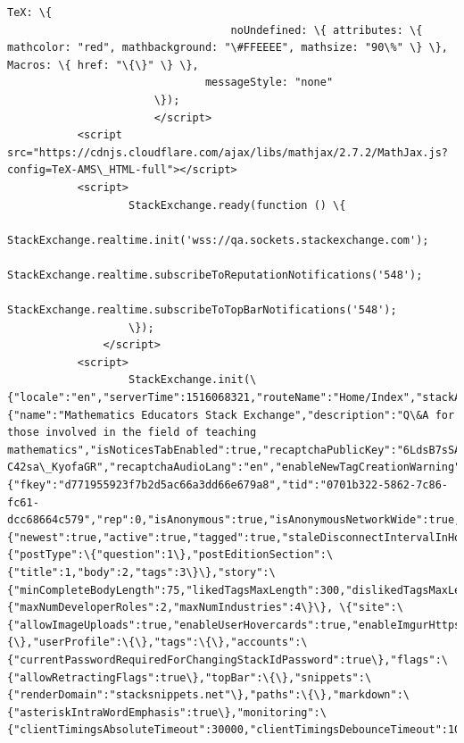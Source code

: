 \documentclass[11pt]{article}
\begin{document}
\begin{Verbatim}[commandchars=\\\{\}]
                               TeX: \{ 
                                   noUndefined: \{ attributes: \{ mathcolor: "red", mathbackground: "\#FFEEEE", mathsize: "90\%" \} \}, Macros: \{ href: "\{\}" \} \},
                               messageStyle: "none"
                       \});
                       </script>
           <script src="https://cdnjs.cloudflare.com/ajax/libs/mathjax/2.7.2/MathJax.js?config=TeX-AMS\_HTML-full"></script>
           <script>
                   StackExchange.ready(function () \{
                       StackExchange.realtime.init('wss://qa.sockets.stackexchange.com');
                       StackExchange.realtime.subscribeToReputationNotifications('548');
                           StackExchange.realtime.subscribeToTopBarNotifications('548');
                   \});
               </script>
           <script>
                   StackExchange.init(\{"locale":"en","serverTime":1516068321,"routeName":"Home/Index","stackAuthUrl":"https://stackauth.com","networkMetaHostname":"meta.stackexchange.com","site":\{"name":"Mathematics Educators Stack Exchange","description":"Q\&A for those involved in the field of teaching mathematics","isNoticesTabEnabled":true,"recaptchaPublicKey":"6LdsB7sSAAAAAAzjgEF\_Hd8vXv-C42sa\_KyofaGR","recaptchaAudioLang":"en","enableNewTagCreationWarning":false,"insertSpaceAfterNameTabCompletion":false,"id":548,"childUrl":"https://matheducators.meta.stackexchange.com","enableSocialMediaInSharePopup":true,"protocol":"https"\},"user":\{"fkey":"d771955923f7b2d5ac66a3dd66e679a8","tid":"0701b322-5862-7c86-fc61-dcc68664c579","rep":0,"isAnonymous":true,"isAnonymousNetworkWide":true,"canSeeNewHeaderDesign":true\},"realtime":\{"newest":true,"active":true,"tagged":true,"staleDisconnectIntervalInHours":0,"workerIframeDomain":"https://cdn.sstatic.net"\},"events":\{"postType":\{"question":1\},"postEditionSection":\{"title":1,"body":2,"tags":3\}\},"story":\{"minCompleteBodyLength":75,"likedTagsMaxLength":300,"dislikedTagsMaxLength":300\},"jobPreferences":\{"maxNumDeveloperRoles":2,"maxNumIndustries":4\}\}, \{"site":\{"allowImageUploads":true,"enableUserHovercards":true,"enableImgurHttps":true,"forceHttpsImages":true\},"comments":\{\},"userProfile":\{\},"tags":\{\},"accounts":\{"currentPasswordRequiredForChangingStackIdPassword":true\},"flags":\{"allowRetractingFlags":true\},"topBar":\{\},"snippets":\{"renderDomain":"stacksnippets.net"\},"paths":\{\},"markdown":\{"asteriskIntraWordEmphasis":true\},"monitoring":\{"clientTimingsAbsoluteTimeout":30000,"clientTimingsDebounceTimeout":1000\}\});

\end{Verbatim}
\end{document}
